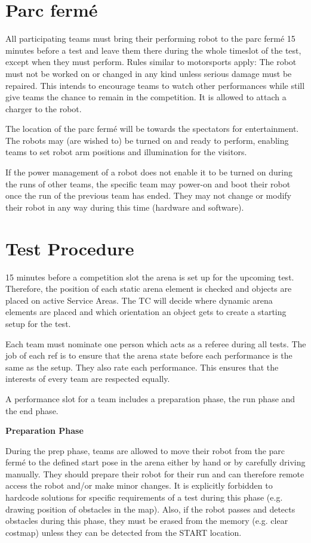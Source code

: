 \section{Parc ferm\'e}

All participating teams must bring their performing robot to the parc ferm\'e 15 minutes before a test and leave them there during the whole timeslot of the test, except when they must perform.
Rules similar to motorsports apply: The robot must not be worked on or changed in any kind unless
serious damage must be repaired. This intends to encourage teams to watch other performances while still give teams the chance to remain in the competition. It is allowed to attach a charger to the robot.

The location of the parc ferm\'e will be towards the spectators for entertainment.
The robots may (are wished to) be turned on and ready to perform, enabling teams to set robot arm positions and illumination for the visitors. 

If the power management of a robot does not enable it to be turned on during the runs of other teams,
the specific team may power-on and boot their robot once the run of the previous team has ended.
They may not change or modify their robot in any way during this time (hardware and software).

\section{Test Procedure}

15 minutes before a competition slot the arena is set up for the upcoming test.
Therefore, the position of each static arena element is checked and objects are placed on active 
Service Areas.
The TC will decide where dynamic arena elements are placed 
and which orientation an object gets to create a starting setup for the test.

Each team must nominate one person which acts as a referee during all tests.
The job of each ref is to ensure that the arena state before each performance is the same as the setup.
They also rate each performance. This ensures that the interests of every team are respected equally.

A performance slot for a team includes a preparation phase, the run phase and the end phase.

\textbf{Preparation Phase}

During the prep phase, teams are allowed to move their robot from the parc ferm\'e to the defined start pose in the arena either by hand or by carefully driving manually. They should prepare their robot for their run and can therefore remote access the robot and/or make minor changes.
It is explicitly forbidden to hardcode solutions for specific requirements of a test during this phase (e.g. drawing position of obstacles in the map). Also, if the robot passes and detects obstacles during this phase, they must be erased from the memory (e.g. clear costmap) unless they can be detected from the START location.

